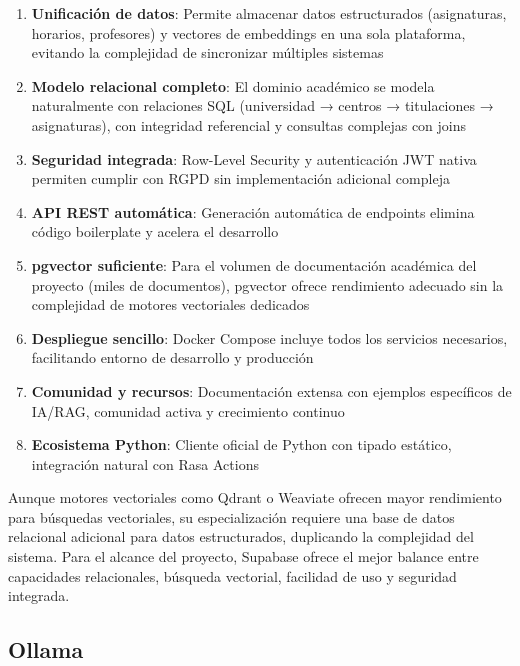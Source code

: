 \begin{enumerate}
    \item \textbf{Unificación de datos}: Permite almacenar datos estructurados (asignaturas, horarios, profesores) y vectores de embeddings en una sola plataforma, evitando la complejidad de sincronizar múltiples sistemas
    
    \item \textbf{Modelo relacional completo}: El dominio académico se modela naturalmente con relaciones SQL (universidad → centros → titulaciones → asignaturas), con integridad referencial y consultas complejas con joins
    
    \item \textbf{Seguridad integrada}: Row-Level Security y autenticación JWT nativa permiten cumplir con RGPD sin implementación adicional compleja
    
    \item \textbf{API REST automática}: Generación automática de endpoints elimina código boilerplate y acelera el desarrollo
    
    \item \textbf{pgvector suficiente}: Para el volumen de documentación académica del proyecto (miles de documentos), pgvector ofrece rendimiento adecuado sin la complejidad de motores vectoriales dedicados
    
    \item \textbf{Despliegue sencillo}: Docker Compose incluye todos los servicios necesarios, facilitando entorno de desarrollo y producción
    
    \item \textbf{Comunidad y recursos}: Documentación extensa con ejemplos específicos de IA/RAG, comunidad activa y crecimiento continuo
    
    \item \textbf{Ecosistema Python}: Cliente oficial de Python con tipado estático, integración natural con Rasa Actions
\end{enumerate}

Aunque motores vectoriales como Qdrant o Weaviate ofrecen mayor rendimiento para búsquedas vectoriales, su especialización requiere una base de datos relacional adicional para datos estructurados, duplicando la complejidad del sistema. Para el alcance del proyecto, Supabase ofrece el mejor balance entre capacidades relacionales, búsqueda vectorial, facilidad de uso y seguridad integrada.

\subsection{Ollama}

